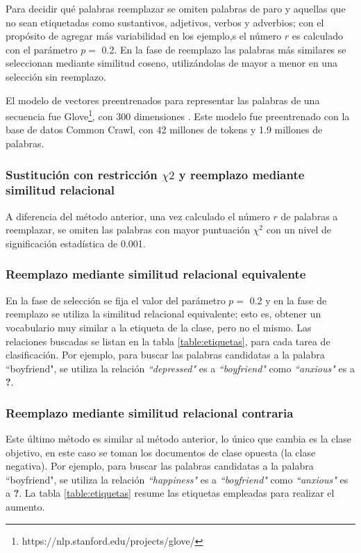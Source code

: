Para decidir qué palabras reemplazar se omiten palabras de paro y aquellas que no sean etiquetadas como sustantivos, adjetivos, verbos y adverbios; con el propósito de agregar más variabilidad en los ejemplo,s el número $r$ es calculado con el parámetro $p=$ 0.2. En la fase de reemplazo las palabras más similares se seleccionan mediante similitud coseno, utilizándolas de mayor a menor en una selección sin reemplazo.

El modelo de vectores preentrenados para representar las palabras de una secuencia fue Glove\footnote{https://nlp.stanford.edu/projects/glove/}, con 300 dimensiones \citep{pennington2014glove}. Este modelo fue preentrenado con la base de datos Common Crawl, con 42 millones de tokens y 1.9 millones de palabras. 


\subsubsection{Sustitución con restricción $\chi2$  y reemplazo mediante similitud relacional}
A diferencia del método anterior, una vez calculado el número $r$ de palabras a reemplazar, se omiten las palabras con mayor puntuación $\chi^2$ con un nivel de significación estadística de 0.001. 


\subsubsection{Reemplazo mediante similitud relacional equivalente}
En la fase de selección se fija el valor del parámetro $p=$ 0.2 y en la fase de reemplazo se utiliza la similitud relacional equivalente; esto es, obtener un vocabulario muy similar a la etiqueta de la clase, pero no el mismo. Las relaciones buscadas se listan en la tabla \ref{table:etiquetas}, para cada tarea de clasificación. Por ejemplo, para buscar las palabras candidatas a la palabra ``boyfriend", se utiliza la relación \textit{``depressed"} es a \textit{``boyfriend"} como \textit{``anxious"} es a \textbf{?}. 

\subsubsection{Reemplazo mediante similitud relacional contraria}
Este último método es similar al método anterior, lo único que cambia es la clase objetivo, en este caso se toman los documentos de clase opuesta (la clase negativa). Por ejemplo, para buscar las palabras candidatas a la palabra ``boyfriend", se utiliza la relación \textit{``happiness"} es a \textit{``boyfriend"} como \textit{``anxious"} es a \textbf{?}. La tabla \ref{table:etiquetas} resume las etiquetas empleadas para realizar el aumento.

